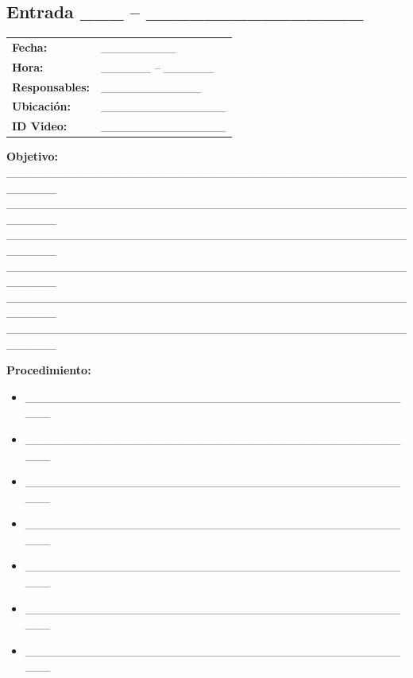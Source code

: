 \subsection*{Entrada \_\_\_ – \_\_\_\_\_\_\_\_\_\_\_\_\_\_\_}

\begin{tabular}{@{}ll@{}}
\textbf{Fecha:} & \_\_\_\_\_\_\_\_\_ \\
\textbf{Hora:} & \_\_\_\_\_\_ – \_\_\_\_\_\_ \\
\textbf{Responsables:} & \_\_\_\_\_\_\_\_\_\_\_\_ \\
\textbf{Ubicación:} & \_\_\_\_\_\_\_\_\_\_\_\_\_\_\_ \\
\textbf{ID Video:} & \_\_\_\_\_\_\_\_\_\_\_\_\_\_\_ \\
\end{tabular}

\vspace{1em}

\textbf{Objetivo:} \\
\_\_\_\_\_\_\_\_\_\_\_\_\_\_\_\_\_\_\_\_\_\_\_\_\_\_\_\_\_\_\_\_\_\_\_\_\_\_\_\_\_\_\_\_\_\_\_\_\_\_\_\_\_\_ \\
\_\_\_\_\_\_\_\_\_\_\_\_\_\_\_\_\_\_\_\_\_\_\_\_\_\_\_\_\_\_\_\_\_\_\_\_\_\_\_\_\_\_\_\_\_\_\_\_\_\_\_\_\_\_ \\
\_\_\_\_\_\_\_\_\_\_\_\_\_\_\_\_\_\_\_\_\_\_\_\_\_\_\_\_\_\_\_\_\_\_\_\_\_\_\_\_\_\_\_\_\_\_\_\_\_\_\_\_\_\_ \\
\_\_\_\_\_\_\_\_\_\_\_\_\_\_\_\_\_\_\_\_\_\_\_\_\_\_\_\_\_\_\_\_\_\_\_\_\_\_\_\_\_\_\_\_\_\_\_\_\_\_\_\_\_\_ \\
\_\_\_\_\_\_\_\_\_\_\_\_\_\_\_\_\_\_\_\_\_\_\_\_\_\_\_\_\_\_\_\_\_\_\_\_\_\_\_\_\_\_\_\_\_\_\_\_\_\_\_\_\_\_ \\
\_\_\_\_\_\_\_\_\_\_\_\_\_\_\_\_\_\_\_\_\_\_\_\_\_\_\_\_\_\_\_\_\_\_\_\_\_\_\_\_\_\_\_\_\_\_\_\_\_\_\_\_\_\_

\vspace{0.5em}
\textbf{Procedimiento:}
\begin{itemize}
  \item \_\_\_\_\_\_\_\_\_\_\_\_\_\_\_\_\_\_\_\_\_\_\_\_\_\_\_\_\_\_\_\_\_\_\_\_\_\_\_\_\_\_\_\_\_\_\_\_
  \item \_\_\_\_\_\_\_\_\_\_\_\_\_\_\_\_\_\_\_\_\_\_\_\_\_\_\_\_\_\_\_\_\_\_\_\_\_\_\_\_\_\_\_\_\_\_\_\_
  \item \_\_\_\_\_\_\_\_\_\_\_\_\_\_\_\_\_\_\_\_\_\_\_\_\_\_\_\_\_\_\_\_\_\_\_\_\_\_\_\_\_\_\_\_\_\_\_\_
  \item \_\_\_\_\_\_\_\_\_\_\_\_\_\_\_\_\_\_\_\_\_\_\_\_\_\_\_\_\_\_\_\_\_\_\_\_\_\_\_\_\_\_\_\_\_\_\_\_
  \item \_\_\_\_\_\_\_\_\_\_\_\_\_\_\_\_\_\_\_\_\_\_\_\_\_\_\_\_\_\_\_\_\_\_\_\_\_\_\_\_\_\_\_\_\_\_\_\_
  \item \_\_\_\_\_\_\_\_\_\_\_\_\_\_\_\_\_\_\_\_\_\_\_\_\_\_\_\_\_\_\_\_\_\_\_\_\_\_\_\_\_\_\_\_\_\_\_\_
  \item \_\_\_\_\_\_\_\_\_\_\_\_\_\_\_\_\_\_\_\_\_\_\_\_\_\_\_\_\_\_\_\_\_\_\_\_\_\_\_\_\_\_\_\_\_\_\_\_

\end{itemize}

